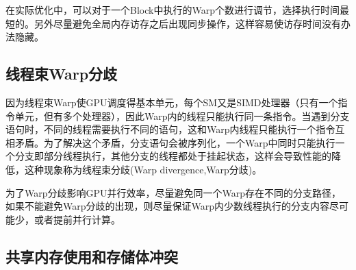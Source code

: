 在实际优化中，可以对于一个Block中执行的Warp个数进行调节，选择执行时间最短的。另外尽量避免全局内存访存之后出现同步操作，这样容易使访存时间没有办法隐藏。

\subsection{线程束Warp分歧}

因为线程束Warp使GPU调度得基本单元，每个SM又是SIMD处理器（只有一个指令单元，但有多个处理器），因此Warp内的线程只能执行同一条指令。当遇到分支语句时，不同的线程需要执行不同的语句，这和Warp内线程只能执行一个指令互相矛盾。为了解决这个矛盾，分支语句会被序列化，一个Warp中同时只能执行一个分支即部分线程执行，其他分支的线程都处于挂起状态，这样会导致性能的降低，这种现象称为线程束分歧(Warp divergence,Warp分歧)。

为了Warp分歧影响GPU并行效率，尽量避免同一个Warp存在不同的分支路径，如果不能避免Warp分歧的出现，则尽量保证Warp内少数线程执行的分支内容尽可能少，或者提前并行计算。

\subsection{共享内存使用和存储体冲突}
\label{cha:chap02:bankconflict}

